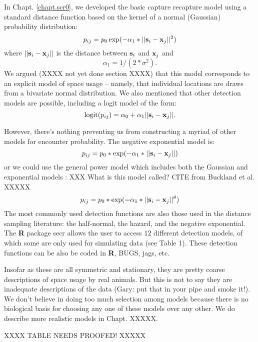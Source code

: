 In Chapt. \ref{chapt.scr0}, we developed the basic capture recapture model using  a
standard distance function based on the kernel of a normal (Gaussian) probability
distribution:
\[
p_{ij} = p_{0} \exp(-\alpha_{1} *||{\bf s}_{i}-{\bf x}_{j}||^2)
\]
where $||{\bf s}_{i}-{\bf x}_{j}||$ is the distance between ${\bf
  s}_{i}$ and ${\bf x}_{j}$ and
\[
\alpha_{1} = 1/(2*\sigma^2).
\]
We argued (XXXX not yet done section XXXX) that this model 
corresponds to an explicit model of space usage -- namely, that
individual locations are draws from a bivariate normal
distribution. We also mentioned that other detection models are
possible, including a logit model of the form:
\begin{equation}
	\mbox{logit}(p_{ij}) = \alpha_{0} + \alpha_1 ||{\bf s}_{i}-{\bf x}_{j} ||.
\label{covariates.eq.logit}
\end{equation}

However, there's nothing preventing us from constructing a myriad of
other models for encounter probability.
The negative exponential model is:
\[
p_{ij} = p_{0}*\exp(-\alpha_{1} *||{\bf s}_{i}-{\bf x}_{j}||)
\]
or we could use the general power model which includes both the
Gaussian and exponential models \citep{russell_etal:2012}: XXX What is
this model called? CITE from Buckland et al. XXXXX
\[
p_{ij} = p_{0}*\exp(-\alpha_{1} *||{\bf s}_{i}-{\bf x}_{j}||^{\theta} )
\]
The most commonly used detection
functions are also those used in the distance sampling literature: the
half-normal, the hazard, and the negative exponential.  
The {\bf R} package
secr allows the user to access 12 different detection models, of which
some are only used for simulating data (see Table 1).  These detection
functions can be also be coded in {\bf R}, BUGS, jags, etc.  

Insofar as these are all symmetric and stationary, they are pretty
coarse descriptions of space usage by real animals. But this is not to
say they are inadequate descriptions of the data (Gary: put that in
your pipe and smoke it!).  We don't believe in doing too much
selection among models because there is no biological basis for
choosing any one of these models over any other. We do describe more
realistic models in Chapt. XXXXX.



XXXX TABLE NEEDS PROOFED! XXXXX

